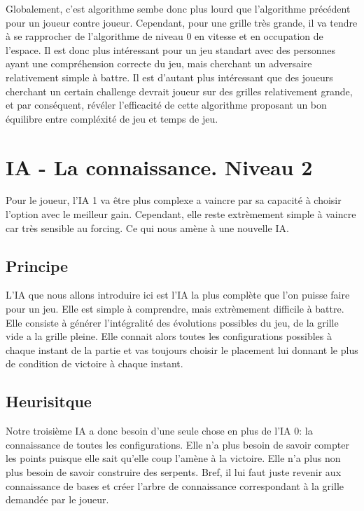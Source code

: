 \documentclass[a4paper,12pt]{report}
\begin{document}
Globalement, c'est algorithme sembe donc plus lourd que l'algorithme pr\'ec\'edent pour un joueur contre joueur. Cependant, pour une grille tr\`es grande, il va tendre \`a se rapprocher de l'algorithme de niveau 0 en vitesse et en occupation de l'espace. Il est donc plus int\'eressant pour un jeu standart avec des personnes ayant une compr\'ehension correcte du jeu, mais cherchant un adversaire relativement simple \`a battre. Il est d'autant plus int\'eressant que des joueurs cherchant un certain challenge devrait joueur sur des grilles relativement grande, et par cons\'equent, r\'ev\'eler l'efficacit\'e de cette algorithme proposant un bon \'equilibre entre compl\'exit\'e de jeu et temps de jeu.

\section{IA - La connaissance. Niveau 2}

Pour le joueur, l'IA 1 va \^etre plus complexe a vaincre par sa capacit\'e \`a choisir l'option avec le meilleur gain. Cependant, elle reste extr\`emement simple \`a vaincre car tr\`es sensible au forcing. Ce qui nous am\`ene \`a une nouvelle IA. 

\subsection{Principe}

L'IA que nous allons introduire ici est l'IA la plus compl\`ete que l'on puisse faire pour un jeu. Elle est simple \`a comprendre, mais extr\`emement difficile \`a battre. Elle consiste \`a g\'en\'erer l'int\'egralit\'e des \'evolutions possibles du jeu, de la grille vide a la grille pleine. Elle connait alors toutes les configurations possibles \`a chaque instant de la partie et vas toujours choisir le placement lui donnant le plus de condition de victoire \`a chaque instant.

\subsection{Heurisitque}

Notre troisi\`eme IA a donc besoin d'une seule chose en plus de l'IA 0: la connaissance de toutes les configurations. Elle n'a plus besoin de savoir compter les points puisque elle sait qu'elle coup l'am\`ene \`a la victoire. Elle n'a plus non plus besoin de savoir construire des serpents. Bref, il lui faut juste revenir aux connaissance de bases et cr\'eer l'arbre de connaissance correspondant \`a la grille demand\'ee par le joueur.
\end{document}
